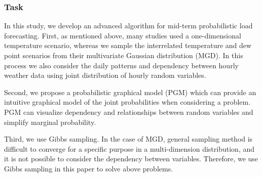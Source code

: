 \documentclass[journal]{IEEEtran} %
\begin{document}






















\subsubsection{Task}
In this study, we develop an advanced algorithm for mid-term probabilistic load forecasting. First, as mentioned above, many studies used a one-dimensional temperature scenario, whereas we sample the interrelated temperature and dew point  scenarios from their multivariate Gaussian distribution (MGD). In this process we also consider the daily patterns and dependency between hourly weather data using joint distribution of hourly random variables. %

Second, we propose a probabilistic graphical model (PGM) which can provide an intuitive graphical model of the joint probabilities when considering a problem. PGM can visualize dependency and relationships between random variables and simplify marginal probability.

Third, we use Gibbs sampling. In the case of MGD, general sampling method is difficult to converge for a specific purpose in a multi-dimension distribution, and it is not possible to consider the dependency between variables. Therefore, we use Gibbs sampling in this paper to solve above problems.
\end{document}
